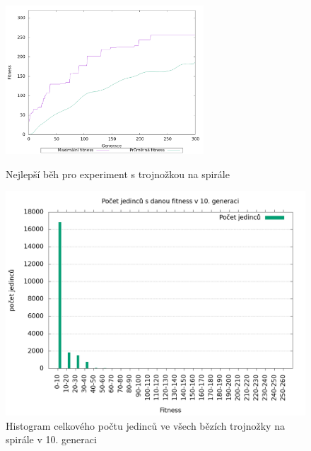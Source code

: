 \begin{figure}[h]
    \begin{minipage}[c]{0.48\linewidth}
    {\includegraphics[width=20em]{obrazky/trojnozka_spirala_fitness_prubeh.png}}
        \caption{
        Nejlepší běh pro experiment s trojnožkou na spirále
        }
    \end{minipage}
    \hfill
    \begin{minipage}[c]{0.48\linewidth}
        \includegraphics[width=\linewidth]{obrazky/trojnozka_spirala_fitnessHistogram10.png}
        \caption{Histogram celkového počtu jedinců ve všech bězích trojnožky na spirále v 10. generaci}
    \end{minipage}
\end{figure}

